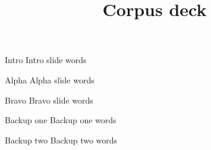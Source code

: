 \documentclass{beamer}
\title{Corpus deck}
\begin{document}
\begin{frame}{Intro}
  Intro slide words
\end{frame}
\begin{frame}{Alpha}
  Alpha slide words
\end{frame}
\begin{frame}{Bravo}
  Bravo slide words
\end{frame}
\appendix
\begin{frame}{Backup one}
  Backup one words
\end{frame}
\begin{frame}{Backup two}
  Backup two words
\end{frame}
\end{document}
